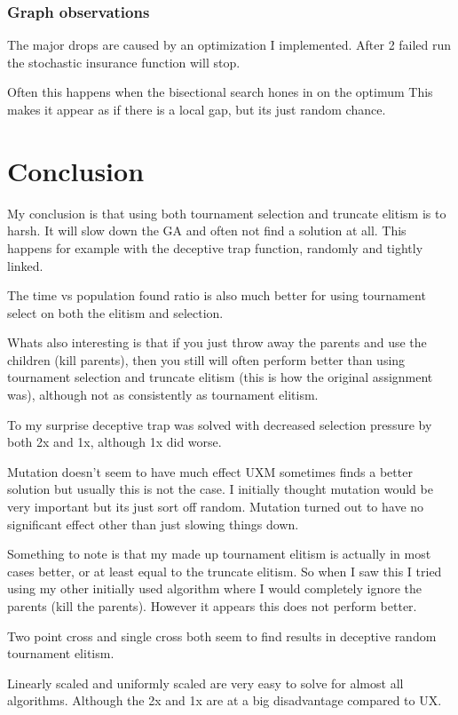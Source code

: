 \documentclass{article}
\begin{document}
\begin{empfile}
\newpage


\subsubsection{Graph observations}
The major drops are caused by an optimization I implemented. After 2 failed
run the stochastic insurance function will stop.

Often this happens when the bisectional search hones in on the optimum
This makes it appear as if there is a local gap, but its just
random chance.

\section{Conclusion}
My conclusion is that using both tournament selection and truncate elitism
is to harsh. It will slow down the GA and often not find a solution at all.
This happens for example with the deceptive trap function, randomly and
tightly linked.

The time vs population found ratio is also much better for using 
tournament select on both the elitism and selection.

Whats also interesting is that if you just throw away the parents and use
the children (kill parents), then you still will often perform better than
using tournament selection and truncate elitism (this is how the original
assignment was), although not as consistently as tournament elitism.

To my surprise deceptive trap was solved with decreased selection pressure
by both 2x and 1x, although 1x did worse. 

Mutation doesn't seem to have much effect UXM sometimes finds a better
solution but usually this is not the case. I initially thought mutation
would be very important but its just sort off random.  Mutation turned out
to have no significant effect other than just slowing things down.

Something to note is that my made up tournament elitism is actually in most
cases better, or at least equal to the truncate elitism. So when I saw
this I tried using my other initially used algorithm where I would completely
ignore the parents (kill the parents). However it appears this does not
perform better.

Two point cross and single cross both seem to find results in deceptive
random tournament elitism.

Linearly scaled and uniformly scaled are very easy to solve for almost all
algorithms. Although the 2x and 1x are at a big disadvantage compared to UX.

\end{empfile}
\end{document}
